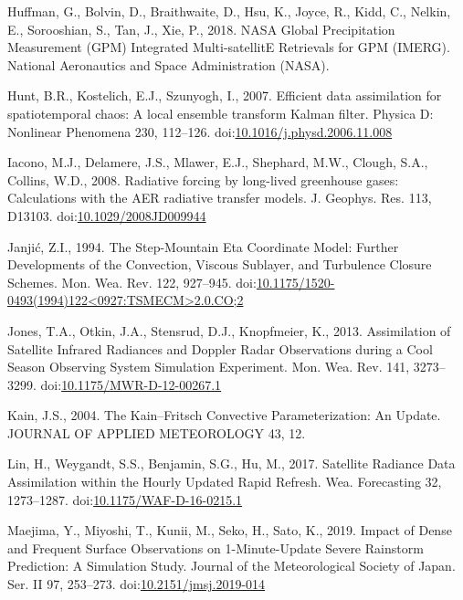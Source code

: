 \documentclass[final,5p,times,twocolumn,authoryear]{elsarticle} %
\begin{document}
\leavevmode\hypertarget{ref-huffman2018}{}%
Huffman, G., Bolvin, D., Braithwaite, D., Hsu, K., Joyce, R., Kidd, C., Nelkin, E., Sorooshian, S., Tan, J., Xie, P., 2018. NASA Global Precipitation Measurement (GPM) Integrated Multi-satellitE Retrievals for GPM (IMERG). National Aeronautics and Space Administration (NASA).

\leavevmode\hypertarget{ref-hunt2007}{}%
Hunt, B.R., Kostelich, E.J., Szunyogh, I., 2007. Efficient data assimilation for spatiotemporal chaos: A local ensemble transform Kalman filter. Physica D: Nonlinear Phenomena 230, 112--126. doi:\href{https://doi.org/10.1016/j.physd.2006.11.008}{10.1016/j.physd.2006.11.008}

\leavevmode\hypertarget{ref-iacono2008}{}%
Iacono, M.J., Delamere, J.S., Mlawer, E.J., Shephard, M.W., Clough, S.A., Collins, W.D., 2008. Radiative forcing by long-lived greenhouse gases: Calculations with the AER radiative transfer models. J. Geophys. Res. 113, D13103. doi:\href{https://doi.org/10.1029/2008JD009944}{10.1029/2008JD009944}

\leavevmode\hypertarget{ref-janjic1994}{}%
Janjić, Z.I., 1994. The Step-Mountain Eta Coordinate Model: Further Developments of the Convection, Viscous Sublayer, and Turbulence Closure Schemes. Mon. Wea. Rev. 122, 927--945. doi:\href{https://doi.org/10.1175/1520-0493(1994)122\%3C0927:TSMECM\%3E2.0.CO;2}{10.1175/1520-0493(1994)122\textless0927:TSMECM\textgreater2.0.CO;2}

\leavevmode\hypertarget{ref-jones2013}{}%
Jones, T.A., Otkin, J.A., Stensrud, D.J., Knopfmeier, K., 2013. Assimilation of Satellite Infrared Radiances and Doppler Radar Observations during a Cool Season Observing System Simulation Experiment. Mon. Wea. Rev. 141, 3273--3299. doi:\href{https://doi.org/10.1175/MWR-D-12-00267.1}{10.1175/MWR-D-12-00267.1}

\leavevmode\hypertarget{ref-kain2004}{}%
Kain, J.S., 2004. The Kain--Fritsch Convective Parameterization: An Update. JOURNAL OF APPLIED METEOROLOGY 43, 12.

\leavevmode\hypertarget{ref-lin2017a}{}%
Lin, H., Weygandt, S.S., Benjamin, S.G., Hu, M., 2017. Satellite Radiance Data Assimilation within the Hourly Updated Rapid Refresh. Wea. Forecasting 32, 1273--1287. doi:\href{https://doi.org/10.1175/WAF-D-16-0215.1}{10.1175/WAF-D-16-0215.1}

\leavevmode\hypertarget{ref-maejima2019}{}%
Maejima, Y., Miyoshi, T., Kunii, M., Seko, H., Sato, K., 2019. Impact of Dense and Frequent Surface Observations on 1-Minute-Update Severe Rainstorm Prediction: A Simulation Study. Journal of the Meteorological Society of Japan. Ser. II 97, 253--273. doi:\href{https://doi.org/10.2151/jmsj.2019-014}{10.2151/jmsj.2019-014}
\end{document}

